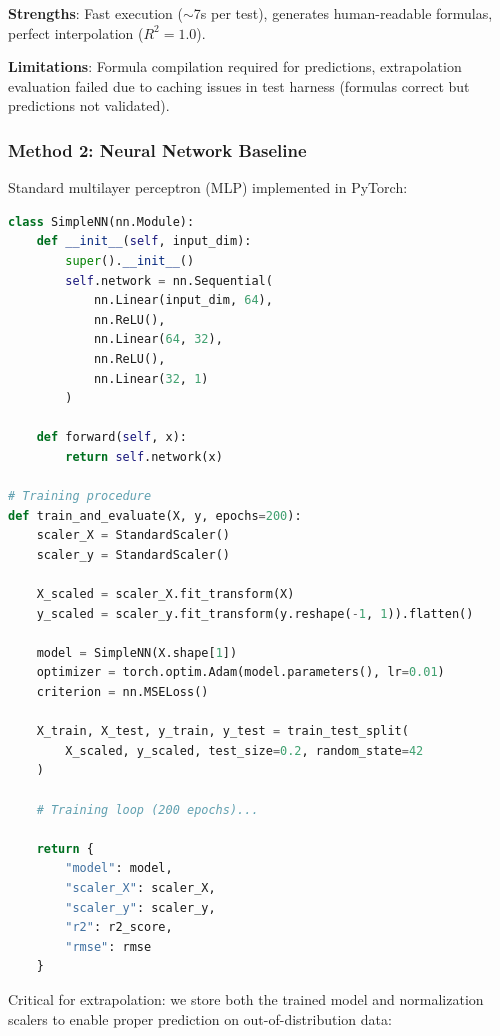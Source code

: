 \documentclass[twoside,11pt]{article}
\begin{document}
\textbf{Strengths}: Fast execution ($\sim$7s per test), generates human-readable formulas, perfect interpolation ($R^2 = 1.0$).

\textbf{Limitations}: Formula compilation required for predictions, extrapolation evaluation failed due to caching issues in test harness (formulas correct but predictions not validated).

\subsubsection{Method 2: Neural Network Baseline}

Standard multilayer perceptron (MLP) implemented in PyTorch:

\begin{lstlisting}[language=Python, caption=Neural Network Architecture]
class SimpleNN(nn.Module):
    def __init__(self, input_dim):
        super().__init__()
        self.network = nn.Sequential(
            nn.Linear(input_dim, 64),
            nn.ReLU(),
            nn.Linear(64, 32),
            nn.ReLU(),
            nn.Linear(32, 1)
        )
    
    def forward(self, x):
        return self.network(x)

# Training procedure
def train_and_evaluate(X, y, epochs=200):
    scaler_X = StandardScaler()
    scaler_y = StandardScaler()
    
    X_scaled = scaler_X.fit_transform(X)
    y_scaled = scaler_y.fit_transform(y.reshape(-1, 1)).flatten()
    
    model = SimpleNN(X.shape[1])
    optimizer = torch.optim.Adam(model.parameters(), lr=0.01)
    criterion = nn.MSELoss()
    
    X_train, X_test, y_train, y_test = train_test_split(
        X_scaled, y_scaled, test_size=0.2, random_state=42
    )
    
    # Training loop (200 epochs)...
    
    return {
        "model": model,
        "scaler_X": scaler_X,
        "scaler_y": scaler_y,
        "r2": r2_score,
        "rmse": rmse
    }
\end{lstlisting}

Critical for extrapolation: we store both the trained model and normalization scalers to enable proper prediction on out-of-distribution data:
\end{document}
